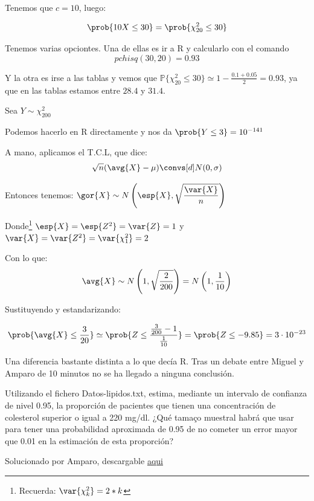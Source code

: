 \begin{problem}[3]
Tenemos que $c = 10$, luego:

\[ \prob{10X \leq 30} = \prob{ \chi^2_{20 }\leq 30}  \]

Tenemos varias opciontes. Una de ellas es ir a R y calcularlo con el comando \[ {pchisq(30,20)} = 0.93 \]

Y la otra es irse a las tablas y vemos que $\mathbb{P}\{\chi^2_{20} \leq 30\} \simeq 1 - \frac{0.1 + 0.05}{2} = 0.93 $, ya que en las tablas estamos entre $28.4$ y $31.4$.

\spart Sea $Y \sim \chi_{200}^2$

Podemos hacerlo en R directamente y nos da $\prob{Y \leq 3} = 10 ^{-141}$

A mano, aplicamos el T.C.L, que dice:
\[ \sqrt{n} (\avg{X} - \mu) \convs[d] N(0,\sigma) \]

Entonces tenemos: $\gor{X} \sim N\left(\esp{X}, \displaystyle \sqrt{\frac{\var{X}}{n}}\right)$

Donde\footnote{Recuerda: $\var{\chi^2_k} = 2 * k$} $\esp{X} = \esp{Z^2} = \var{Z} = 1$ y $\var{X} = \var{Z^2} = \var{\chi^2_1} = 2 $

Con lo que:
\[
\avg{X} \sim N \left( 1, \sqrt{\frac{2}{200}} \right) = N \left( 1,\frac{1}{10} \right)
\]

Sustituyendo y estandarizando:

\[
\prob{\avg{X} \leq \frac{3}{20} } \simeq \prob{Z \leq \frac{\frac{3}{200} - 1}{\frac{1}{10}} } = \prob{Z \leq -9.85} = 3 \cdot 10^{-23}
\]

Una diferencia bastante distinta a lo que decía R. Tras un debate entre Miguel y Amparo de 10 minutos no se ha llegado a ninguna conclusión.
\end{problem}

\begin{problem}[4]
\ppart Utilizando el fichero Datos-lipidos.txt, estima, mediante un intervalo de confianza de nivel
0.95, la proporción de pacientes que tienen una concentración de colesterol superior o igual a
220 mg/dl. ¿Qué tamaço muestral habrá que usar para tener una probabilidad aproximada de 0.95 de no cometer un error mayor que 0.01 en la estimación de esta proporción?

\ppart
\solution
Solucionado por Amparo, descargable 
\href{http://www.uam.es/personal_pdi/ciencias/abaillo/MatEstI/T4DatosLipidos.pdf}{aqui}
\end{problem}

